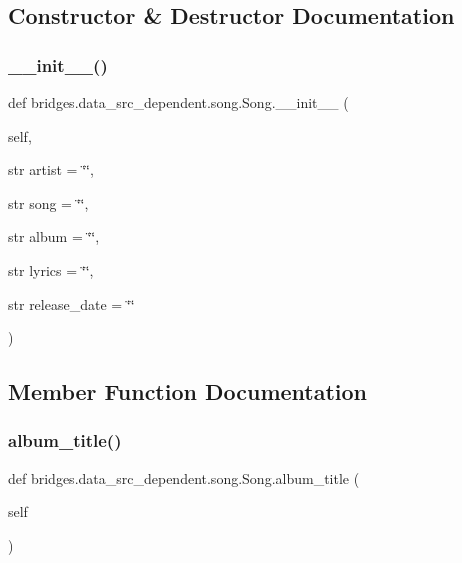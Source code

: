\subsection{Constructor \& Destructor Documentation}
\mbox{\label{classbridges_1_1data__src__dependent_1_1song_1_1_song_a8afad65f77f1752a32fb462c6456aa67}} 
\subsubsection{\texorpdfstring{\_\_init\_\_()}{\_\_init\_\_()}}
{\footnotesize\ttfamily def bridges.\+data\+\_\+src\+\_\+dependent.\+song.\+Song.\+\_\+\+\_\+init\+\_\+\+\_\+ (\begin{DoxyParamCaption}\item[{}]{self,  }\item[{str }]{artist = {\ttfamily \char`\"{}\char`\"{}},  }\item[{str }]{song = {\ttfamily \char`\"{}\char`\"{}},  }\item[{str }]{album = {\ttfamily \char`\"{}\char`\"{}},  }\item[{str }]{lyrics = {\ttfamily \char`\"{}\char`\"{}},  }\item[{str }]{release\+\_\+date = {\ttfamily \char`\"{}\char`\"{}} }\end{DoxyParamCaption})}



\subsection{Member Function Documentation}
\mbox{\label{classbridges_1_1data__src__dependent_1_1song_1_1_song_a5ecb8e966ffd3659875ed3b751ed294c}} 
\subsubsection{\texorpdfstring{album\_title()}{album\_title()}\hspace{0.1cm}{\footnotesize\ttfamily [1/2]}}
{\footnotesize\ttfamily def bridges.\+data\+\_\+src\+\_\+dependent.\+song.\+Song.\+album\+\_\+title (\begin{DoxyParamCaption}\item[{}]{self }\end{DoxyParamCaption})}


